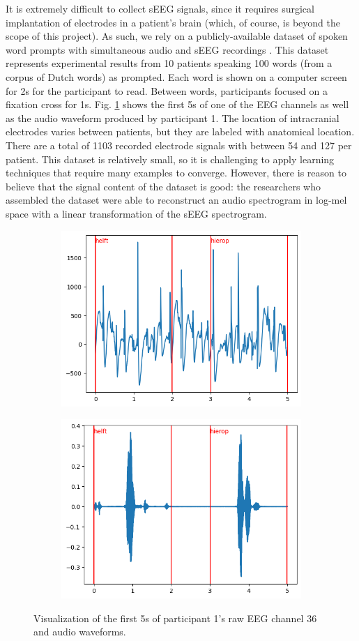 \documentclass[format=sigconf, nonacm=true, review=false, screen=true]{acmart}
\begin{document}
It is extremely difficult to collect sEEG signals, since it requires surgical implantation of electrodes in a patient's brain (which, of course, is beyond the scope of this project). As such, we rely on a publicly-available dataset of spoken word prompts with simultaneous audio and sEEG recordings \cite{verwoert2022dataset}. This dataset represents experimental results from 10 patients speaking 100 words (from a corpus of Dutch words) as prompted. Each word is shown on a computer screen for 2s for the participant to read. Between words, participants focused on a fixation cross for 1s. Fig. \ref{fig:data_vis} shows the first 5s of one of the EEG channels as well as the audio waveform produced by participant 1. The location of intracranial electrodes varies between patients, but they are labeled with anatomical location. There are a total of 1103 recorded electrode signals with between 54 and 127 per patient. This dataset is relatively small, so it is challenging to apply learning techniques that require many examples to converge. However, there is reason to believe that the signal content of the dataset is good: the researchers who assembled the dataset were able to reconstruct an audio spectrogram in log-mel space with a linear transformation of the sEEG spectrogram.

\begin{figure}
     \centering
     \begin{subfigure}
         \centering
         \includegraphics[width=0.48\columnwidth]{figures/data_eeg.png}
     \end{subfigure}
     \begin{subfigure}
         \centering
         \includegraphics[width=0.48\columnwidth]{figures/data_audio.png}
     \end{subfigure}
     \caption{Visualization of the first 5s of participant 1's raw EEG channel 36 and audio waveforms.}
     \label{fig:data_vis}
\end{figure}
\end{document}
